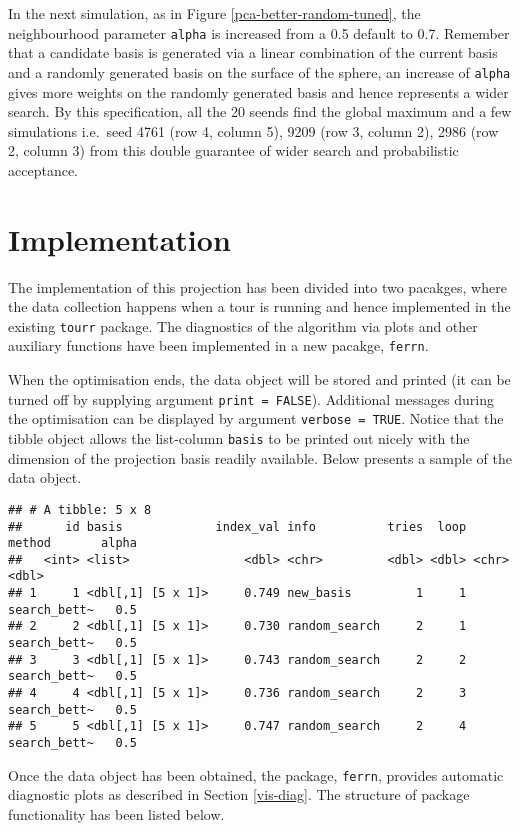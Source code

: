 \documentclass[12pt]{article}
\begin{document}
In the next simulation, as in Figure \ref{pca-better-random-tuned}, the neighbourhood parameter \texttt{alpha} is increased from a 0.5 default to 0.7. Remember that a candidate basis is generated via a linear combination of the current basis and a randomly generated basis on the surface of the sphere, an increase of \texttt{alpha} gives more weights on the randomly generated basis and hence represents a wider search. By this specification, all the 20 seends find the global maximum and a few simulations i.e.~seed 4761 (row 4, column 5), 9209 (row 3, column 2), 2986 (row 2, column 3) from this double guarantee of wider search and probabilistic acceptance.

\hypertarget{implementation}{%
\section{Implementation}\label{implementation}}

The implementation of this projection has been divided into two pacakges, where the data collection happens when a tour is running and hence implemented in the existing \texttt{tourr} package. The diagnostics of the algorithm via plots and other auxiliary functions have been implemented in a new pacakge, \texttt{ferrn}.

When the optimisation ends, the data object will be stored and printed (it can be turned off by supplying argument \texttt{print\ =\ FALSE}). Additional messages during the optimisation can be displayed by argument \texttt{verbose\ =\ TRUE}. Notice that the tibble object allows the list-column \texttt{basis} to be printed out nicely with the dimension of the projection basis readily available. Below presents a sample of the data object.

\begin{verbatim}
## # A tibble: 5 x 8
##      id basis             index_val info          tries  loop method       alpha
##   <int> <list>                <dbl> <chr>         <dbl> <dbl> <chr>        <dbl>
## 1     1 <dbl[,1] [5 x 1]>     0.749 new_basis         1     1 search_bett~   0.5
## 2     2 <dbl[,1] [5 x 1]>     0.730 random_search     2     1 search_bett~   0.5
## 3     3 <dbl[,1] [5 x 1]>     0.743 random_search     2     2 search_bett~   0.5
## 4     4 <dbl[,1] [5 x 1]>     0.736 random_search     2     3 search_bett~   0.5
## 5     5 <dbl[,1] [5 x 1]>     0.747 random_search     2     4 search_bett~   0.5
\end{verbatim}

Once the data object has been obtained, the package, \texttt{ferrn}, provides automatic diagnostic plots as described in Section \ref{vis-diag}. The structure of package functionality has been listed below.
\end{document}
